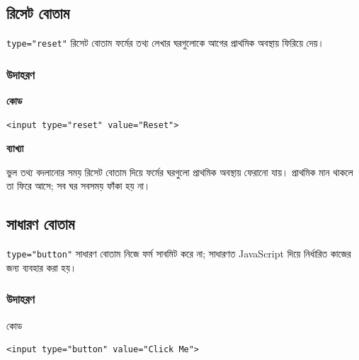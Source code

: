 \subsection{রিসেট বোতাম}

\begin{definitionbox}{\texttt{type="reset"}}
রিসেট বোতাম ফর্মের তথ্য লেখার ঘরগুলোকে আগের প্রাথমিক অবস্থায় ফিরিয়ে দেয়।
\end{definitionbox}

\subsubsection{উদাহরণ}

\par\noindent
\begin{minipage}[t]{.50\linewidth}\vspace{0pt}\small
\textbf{\color{chFourTeal}কোড}\par
\begin{verbatim}
<input type="reset" value="Reset">
\end{verbatim}

\par\smallskip
\end{minipage}\hfill
\begin{minipage}[t]{.46\linewidth}\vspace{0pt}\small
\textbf{\color{chFourTeal}ব্যাখ্যা}\par
ভুল তথ্য বদলানোর সময় রিসেট বোতাম দিয়ে ফর্মের ঘরগুলো প্রাথমিক অবস্থায় ফেরানো যায়। প্রাথমিক মান থাকলে তা ফিরে আসে; সব ঘর সবসময় ফাঁকা হয় না।
\end{minipage}\par
\subsection{সাধারণ বোতাম}

\begin{definitionbox}{\texttt{type="button"}}
সাধারণ বোতাম নিজে ফর্ম সাবমিট করে না; সাধারণত JavaScript দিয়ে নির্ধারিত কাজের জন্য ব্যবহার করা হয়।
\end{definitionbox}

\subsubsection{উদাহরণ}

\begin{examplebox}{কোড}
\par\noindent\begin{minipage}{\linewidth}
\begin{verbatim}
<input type="button" value="Click Me">
\end{verbatim}
\end{minipage}\par
\end{examplebox}

